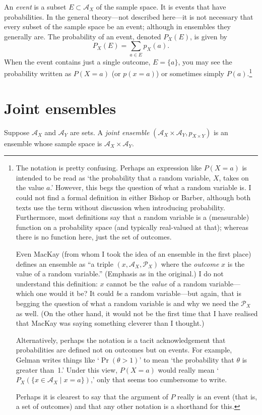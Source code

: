 \documentclass[10pt, a4paper, twocolumn]{article}
\begin{document}
An \emph{event} is a subset $E\subset \mathcal{A}_X$ of the sample space. It is events
that have probabilities. In the general theory---not described here---it is not
necessary that every subset of the sample space be an event; although in
ensembles they generally are. The probability of an event, denoted $P_X(E)$, is
given by
\[
P_X(E) = \sum_{a\in E} p_X(a).
\]
When the event contains just a single outcome, $E = \{a\}$, you may see the
probability written as $P(X = a)$ (or $p(x = a)$) or sometimes simply
$P(a)$.\footnote{The notation is pretty confusing. Perhaps an expression like
$P(X = a)$ is intended to be read as `the probability that a random variable,
$X$, takes on the value $a$.' However, this begs the question of what a random
variable is. I could not find a formal definition in either Bishop or Barber,
although both texts use the term without discussion when introducing
probability. Furthermore, most definitions say that a random variable is a
(measurable) function on a probability space (and typically real-valued at that);
whereas there is no function here, just the set of outcomes.

Even MacKay (from whom I took the idea of an ensemble in the first place)
defines an ensemble as ``a triple $(x, \mathcal{A}_X, \mathcal{P}_X)$ where the
\emph{outcome} $x$ is the value of a random variable.'' (Emphasis as in the
original.) I do not understand this definition: $x$ cannot be the \emph{value}
of a random variable---which one would it be? It could \emph{be} a random
variable---but again, that is begging the question of what a random variable is
and why we need the $\mathcal{P}_X$ as well. (On the other hand, it would not be
the first time that I have realised that MacKay was saying something cleverer
than I thought.)

Alternatively, perhaps the notation is a tacit acknowledgement that
probabilities are defined not on outcomes but on events. For example, Gelman
writes things like `$\operatorname{Pr}(\theta > 1)$' to mean `the probability that
$\theta$ is greater than~1.' Under this view, $P(X = a)$ would really mean `$P_X(\{x\in
\mathcal{A}_X \mid x = a\})$,' only that seems too cumbersome to write.

Perhaps it is clearest to say that the argument of $P$ really is an event (that
is, a set of outcomes) and that any other notation is a shorthand for this.}

\section*{Joint ensembles}
Suppose $\mathcal{A}_X$ and $\mathcal{A}_Y$ are sets. A \emph{joint ensemble}
$(\mathcal{A}_X\times \mathcal{A}_Y, p_{X\times Y})$ is an ensemble whose sample space is
$\mathcal{A}_X\times \mathcal{A}_Y$. 
\end{document}
